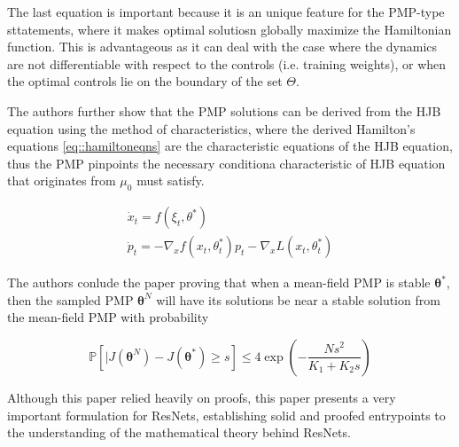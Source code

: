 The last equation is important because it is an unique feature for the PMP-type sttatements, where it makes optimal solutiosn globally maximize the Hamiltonian function. This is advantageous as it can deal with the case where the dynamics are not differentiable with respect to the controls (i.e. training weights), or when the optimal controls lie on the boundary of the set $\Theta$.

The authors further show that the PMP solutions can be derived from the HJB equation using the method of characteristics, where the derived Hamilton's equations \ref{eq::hamiltoneqns} are the characteristic equations of the HJB equation, thus the PMP pinpoints the necessary conditiona characteristic of HJB equation that originates from $\mu_0$ must satisfy.

\begin{align} \label{eq::hamiltoneqns}
    \dot{x}_t = f(\xi_t,\theta^*) \\
    \dot{p}_t = -\nabla_x f(x_t,\theta_t^*) p_t - \nabla_x L (x_t,\theta_t^*)
\end{align}

The authors conlude the paper proving that when a mean-field PMP is stable $\bm{\theta}^*$, then the sampled PMP $\bm{\theta}^N$ will have its solutions be near a stable solution from the mean-field PMP with probability

$$\mathbb{P}[|J(\bm{\theta}^N) - J(\bm{\theta}^*) \geq s] \leq 4 \exp\left( - \frac{Ns^2}{K_1 + K_2 s}\right)$$


Although this paper relied heavily on proofs, this paper presents a very important formulation for ResNets, establishing solid and proofed entrypoints to the understanding of the mathematical theory behind ResNets.
